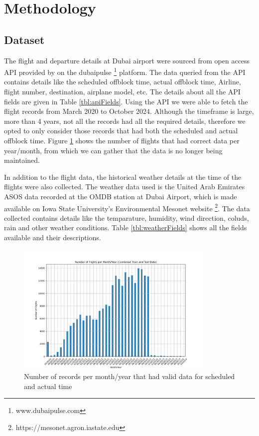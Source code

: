 \documentclass[twoside,11pt]{article}
\begin{document}
\section{Methodology}
\subsection{Dataset}
The flight and departure details at Dubai airport were sourced from open access API provided by \cite{dubaiairportsDatasetDa_flight_information_departuresopenapi} on the dubaipulse \footnote{www.dubaipulse.com} platform. The data queried from the API contains details like the scheduled offblock time, actual offblock time, Airline, flight number, destination, airplane model, etc. The details about all the API fields are given in Table \ref{tbl:apiFields}. Using the API we were able to fetch the flight records from March 2020 to October 2024. Although the timeframe is large, more than 4 years, not all the records had all the required details, therefore we opted to only consider those records that had both the scheduled and actual offblock time. Figure \ref{fig:flightsYearMonth} shows the number of flights that had correct data per year/month, from which we can gather that the data is no longer being maintained.

In addition to the flight data, the historical weather details at the time of the flights were also collected. The weather data used is the United Arab Emirates ASOS data recorded at the OMDB station at Dubai Airport, which is made available on Iowa State University's Environmental Mesonet website \footnote{https://mesonet.agron.iastate.edu}. The data collected contains details like the temparature, humidity, wind direction, coluds, rain and other weather conditions. Table \ref{tbl:weatherFields} shows all the fields available and their descriptions. 
\begin{figure}
  \centering
  \includegraphics[width=0.85\textwidth]{images/flights_per_month_year.png}
  \caption{Number of records per month/year that had valid data for scheduled and actual time}
  \label{fig:flightsYearMonth}
\end{figure}
\end{document}
